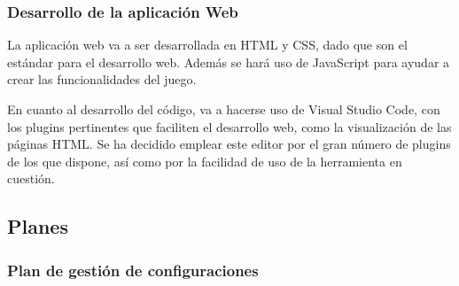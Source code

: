 \documentclass{article}
\begin{document}
\subsubsection{Desarrollo de la aplicación Web}
La aplicación web va a ser desarrollada en HTML y CSS, dado que son el estándar para el desarrollo web. Además se hará uso de JavaScript para ayudar a crear las funcionalidades del juego.

En cuanto al desarrollo del código, va a hacerse uso de Visual Studio Code, con los plugins pertinentes que faciliten el desarrollo web, como la visualización de las páginas HTML. Se ha decidido emplear este editor por el gran número de plugins de los que dispone, así como por la facilidad de uso de la herramienta en cuestión.

\subsection{Planes}

\subsubsection{Plan de gestión de configuraciones}




\end{document}
